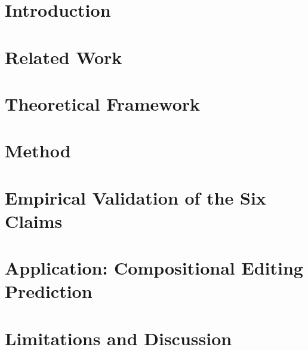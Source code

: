 \documentclass[10pt,twocolumn,letterpaper]{article}
\begin{document}
\section{Introduction}
\label{sec:intro}


\section{Related Work}
\label{sec:related}


\section{Theoretical Framework}
\label{sec:theory}


\section{Method}
\label{sec:method}


\section{Empirical Validation of the Six Claims}
\label{sec:experiments}


\section{Application: Compositional Editing Prediction}
\label{sec:application}


\section{Limitations and Discussion}
\label{sec:discussion}


{\small


}
\end{document}
